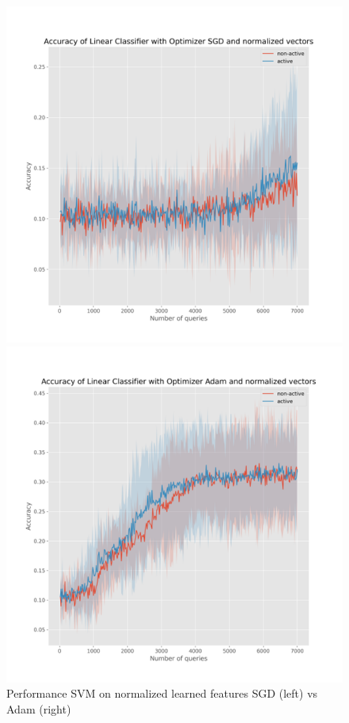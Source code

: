 \documentclass{article}
\begin{document}
\begin{figure}[h]
  \centering
  \begin{minipage}{.45\textwidth}
    \centering
    \includegraphics[width=\linewidth]{active-vs-base-mnist-linear-loss-SGD-normalized-ci}
  \end{minipage}%
  \begin{minipage}{.45\textwidth}
    \centering
    \includegraphics[width=\linewidth]{active-vs-base-mnist-linear-loss-Adam-normalized-ci}
  \end{minipage}
  \caption{Performance SVM on normalized learned features SGD (left) vs Adam (right)}\label{fig:svm-normalized-ci-mnist}
\end{figure}
\end{document}
